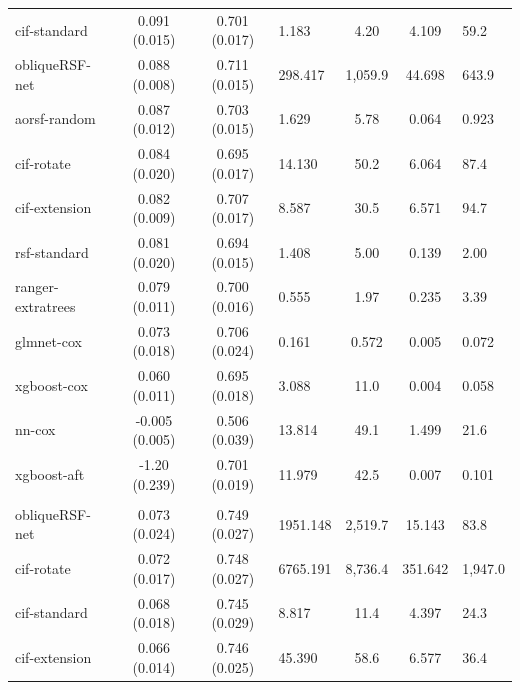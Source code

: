 \documentclass[twoside,11pt]{article}\usepackage[]{graphicx}\usepackage[]{xcolor}
\newenvironment{knitrout}{}{} %
\begin{document}
\begin{knitrout}
\begin{longtable}{lcclccl}
\hspace{1em}cif-standard & 0.091 (0.015) & 0.701 (0.017) & 1.183 & 4.20 & 4.109 & 59.2\\
\hspace{1em}obliqueRSF-net & 0.088 (0.008) & 0.711 (0.015) & 298.417 & 1,059.9 & 44.698 & 643.9\\
\hspace{1em}aorsf-random & 0.087 (0.012) & 0.703 (0.015) & 1.629 & 5.78 & 0.064 & 0.923\\
\hspace{1em}cif-rotate & 0.084 (0.020) & 0.695 (0.017) & 14.130 & 50.2 & 6.064 & 87.4\\
\hspace{1em}cif-extension & 0.082 (0.009) & 0.707 (0.017) & 8.587 & 30.5 & 6.571 & 94.7\\
\hspace{1em}rsf-standard & 0.081 (0.020) & 0.694 (0.015) & 1.408 & 5.00 & 0.139 & 2.00\\
\hspace{1em}ranger-extratrees & 0.079 (0.011) & 0.700 (0.016) & 0.555 & 1.97 & 0.235 & 3.39\\
\hspace{1em}glmnet-cox & 0.073 (0.018) & 0.706 (0.024) & 0.161 & 0.572 & 0.005 & 0.072\\
\hspace{1em}xgboost-cox & 0.060 (0.011) & 0.695 (0.018) & 3.088 & 11.0 & 0.004 & 0.058\\
\hspace{1em}nn-cox & -0.005 (0.005) & 0.506 (0.039) & 13.814 & 49.1 & 1.499 & 21.6\\
\hspace{1em}xgboost-aft & -1.20 (0.239) & 0.701 (0.019) & 11.979 & 42.5 & 0.007 & 0.101\\
\addlinespace[0.3em]
\hline
\multicolumn{7}{l}{\textit{\textbf{Early breast cancer; recurrence or death, n = 614, p = 1692}}}\\
\hline
\hspace{1em}obliqueRSF-net & 0.073 (0.024) & 0.749 (0.027) & 1951.148 & 2,519.7 & 15.143 & 83.8\\
\hspace{1em}cif-rotate & 0.072 (0.017) & 0.748 (0.027) & 6765.191 & 8,736.4 & 351.642 & 1,947.0\\
\hspace{1em}cif-standard & 0.068 (0.018) & 0.745 (0.029) & 8.817 & 11.4 & 4.397 & 24.3\\
\hspace{1em}cif-extension & 0.066 (0.014) & 0.746 (0.025) & 45.390 & 58.6 & 6.577 & 36.4\\

\end{longtable}
\end{knitrout}
\end{document}

